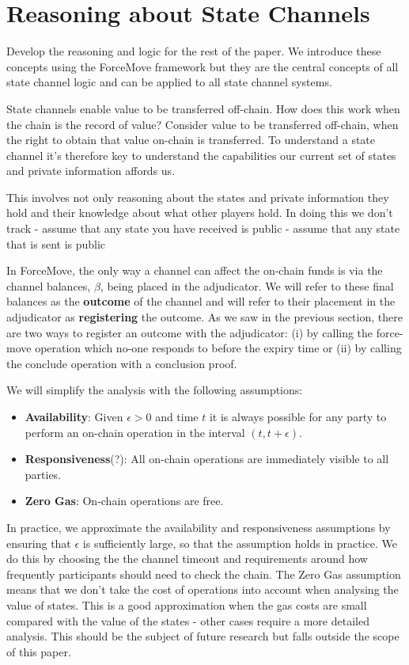 \section{Reasoning about State Channels}

Develop the reasoning and logic for the rest of the paper.
We introduce these concepts using the ForceMove framework but they are the central concepts of all state channel logic and can be applied to all state channel systems.

State channels enable value to be transferred off-chain.
How does this work when the chain is the record of value?
Consider value to be transferred off-chain, when the right to obtain
that value on-chain is transferred.
To understand a state channel it's therefore key to understand the capabilities our current set of states and private information affords us.

This involves not only reasoning about the states and private information they hold and their knowledge about what other players hold. In doing this
we don't track 
- assume that any state you have received is public
- assume that any state that is sent is public

In ForceMove, the only way a channel can affect the on-chain funds is via
the channel balances, $\beta$, being placed in the adjudicator. We will
refer to these final balances as the \textbf{outcome} of the channel and
will refer to their placement in the adjudicator as \textbf{registering} the outcome. As we saw in the previous section, there are two ways to register an outcome with the adjudicator: (i) by calling the force-move operation which no-one responds to before the expiry time or (ii) by calling the conclude operation with a conclusion proof.

We will simplify the analysis with the following assumptions:
\begin{itemize}
\item \textbf{Availability}: Given $\epsilon > 0$ and time $t$ it is always possible for any party to perform an on-chain operation in the interval $(t, t+\epsilon)$.
\item \textbf{Responsiveness}(?): All on-chain operations are immediately visible to all parties.
\item \textbf{Zero Gas}: On-chain operations are free.
\end{itemize}
In practice, we approximate the availability and responsiveness assumptions by ensuring that $\epsilon$ is sufficiently large, so that the assumption holds in practice. We do this by choosing the the channel timeout and requirements around how frequently participants should need to check the chain. The Zero Gas assumption means that we don't take the cost of operations into account when analysing the value of states. This is a good approximation when the gas costs are small compared with the value of the states - other cases require a more detailed analysis. This should be the subject of future research but falls outside the scope of this paper.


